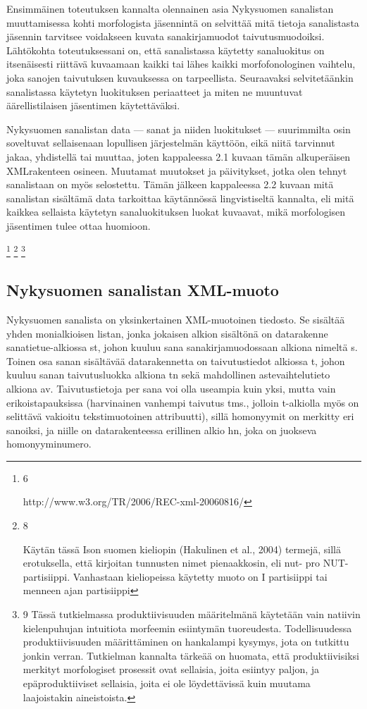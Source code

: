 \documentclass[free]{flammie}
\begin{document}
Ensimmäinen toteutuksen kannalta olennainen asia Nykysuomen sanalistan
muuttamisessa kohti morfologista jäsennintä on selvittää mitä tietoja
sanalistasta jäsennin tarvitsee voidakseen kuvata sanakirjamuodot
taivutusmuodoiksi. Lähtökohta toteutuksessani on, että sanalistassa käytetty
sanaluokitus on itsenäisesti riittävä kuvaamaan kaikki tai lähes kaikki
morfofonologinen vaihtelu, joka sanojen taivutuksen kuvauksessa on tarpeellista.
Seuraavaksi selvitetäänkin sanalistassa käytetyn luokituksen periaatteet ja
miten ne muuntuvat äärellistilaisen jäsentimen käytettäväksi.

Nykysuomen
sanalistan data — sanat ja niiden luokitukset — suurimmilta osin soveltuvat
sellaisenaan lopullisen järjestelmän käyttöön, eikä niitä tarvinnut jakaa,
yhdistellä tai muuttaa, joten kappaleessa 2.1 kuvaan tämän alkuperäisen
XMLrakenteen osineen. Muutamat muutokset ja päivitykset, jotka olen tehnyt
sanalistaan on myös selostettu. Tämän jälkeen kappaleessa 2.2 kuvaan mitä
sanalistan sisältämä data tarkoittaa käytännössä lingvistiseltä kannalta, eli
mitä kaikkea sellaista käytetyn sanaluokituksen luokat kuvaavat, mikä
morfologisen jäsentimen tulee ottaa huomioon.

\footnote{
6

http://www.w3.org/TR/2006/REC-xml-20060816/
}
\footnote{8

Käytän tässä Ison suomen kieliopin (Hakulinen et al., 2004) termejä, sillä erotuksella, että kirjoitan tunnusten nimet pienaakkosin, eli nut- pro NUT-partisiippi. Vanhastaan kieliopeissa käytetty
muoto on I partisiippi tai menneen ajan partisiippi}
\footnote{
9
Tässä tutkielmassa produktiivisuuden määritelmänä käytetään vain natiivin kielenpuhujan intuitiota morfeemin esiintymän tuoreudesta. Todellisuudessa produktiivisuuden määrittäminen on
hankalampi kysymys, jota on tutkittu jonkin verran. Tutkielman kannalta tärkeää on huomata, että
produktiivisiksi merkityt morfologiset prosessit ovat sellaisia, joita esiintyy paljon, ja epäproduktiiviset sellaisia, joita ei ole löydettävissä kuin muutama laajoistakin aineistoista.
}




\subsection{Nykysuomen sanalistan XML-muoto}

Nykysuomen sanalista on yksinkertainen XML-muotoinen tiedosto. Se sisältää yhden
monialkioisen listan, jonka jokaisen alkion sisältönä on datarakenne
sanatietue-alkiossa st, johon kuuluu sana sanakirjamuodossaan alkiona nimeltä s.
Toinen osa sanan sisältävää datarakennetta on taivutustiedot alkiossa t, johon
kuuluu sanan taivutusluokka alkiona tn sekä mahdollinen astevaihtelutieto
alkiona av. Taivutustietoja per sana voi olla useampia kuin yksi, mutta vain
erikoistapauksissa (harvinainen vanhempi taivutus tms., jolloin t-alkiolla myös
on selittävä vakioitu tekstimuotoinen attribuutti), sillä homonyymit on merkitty
eri sanoiksi, ja niille on datarakenteessa erillinen alkio hn, joka on juokseva
homonyyminumero.
\end{document}
